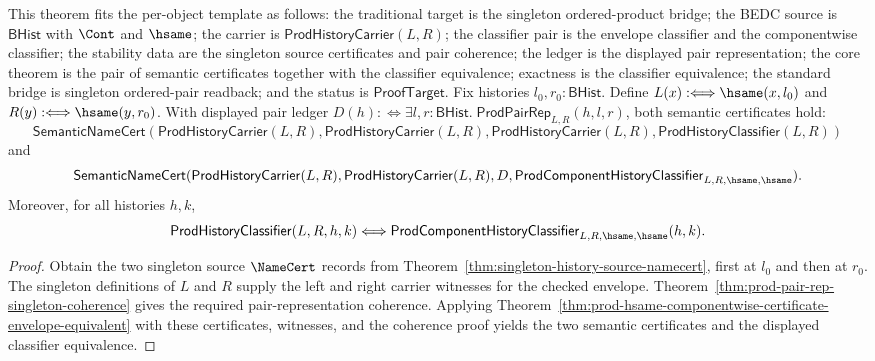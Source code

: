 \begin{theorem}
\label{thm:prod-singleton-hsame-envelope-equivalent}
This theorem fits the per-object template as follows: the traditional target is
the singleton ordered-product bridge; the BEDC source is $\mathsf{BHist}$ with
$\Cont$ and $\hsame$; the carrier is $\mathsf{ProdHistoryCarrier}(L,R)$; the
classifier pair is the envelope classifier and the componentwise classifier; the
stability data are the singleton source certificates and pair coherence; the
ledger is the displayed pair representation; the core theorem is the pair of
semantic certificates together with the classifier equivalence; exactness is
the classifier equivalence; the standard bridge is singleton ordered-pair
readback; and the status is $\mathsf{ProofTarget}$. Fix histories
$l_0,r_0:\mathsf{BHist}$. Define
$L(x):\Longleftrightarrow\hsame(x,l_0)$ and
$R(y):\Longleftrightarrow\hsame(y,r_0)$. With displayed pair ledger
$D(h):\Longleftrightarrow
\exists l,r:\mathsf{BHist}.\;\mathsf{ProdPairRep}_{L,R}(h,l,r)$, both
semantic certificates hold:
$$
\mathsf{SemanticNameCert}(\mathsf{ProdHistoryCarrier}(L,R),
\mathsf{ProdHistoryCarrier}(L,R),
\mathsf{ProdHistoryCarrier}(L,R),
\mathsf{ProdHistoryClassifier}(L,R))
$$
and
$$
\mathsf{SemanticNameCert}(\mathsf{ProdHistoryCarrier}(L,R),
\mathsf{ProdHistoryCarrier}(L,R),
D,
\mathsf{ProdComponentHistoryClassifier}_{L,R,\hsame,\hsame}).
$$
Moreover, for all histories $h,k$,
$$
\mathsf{ProdHistoryClassifier}(L,R,h,k)
\Longleftrightarrow
\mathsf{ProdComponentHistoryClassifier}_{L,R,\hsame,\hsame}(h,k).
$$
\end{theorem}
\begin{proof}
Obtain the two singleton source $\NameCert$ records from
Theorem~\ref{thm:singleton-history-source-namecert}, first at $l_0$ and then
at $r_0$. The singleton definitions of $L$ and $R$ supply the left and right
carrier witnesses for the checked envelope. Theorem~\ref{thm:prod-pair-rep-singleton-coherence}
gives the required pair-representation coherence. Applying
Theorem~\ref{thm:prod-hsame-componentwise-certificate-envelope-equivalent}
with these certificates, witnesses, and the coherence proof yields the two
semantic certificates and the displayed classifier equivalence.
\end{proof}
